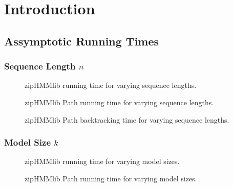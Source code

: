 \documentclass[oneside,a4,danish,english,report]{memoir}
\begin{document}
\tableofcontents

\mainmatter{}

\chapter{Introduction}
\label{cha:introduction}

\section{Assymptotic Running Times}
\label{sec:assymp-runn-times}

\subsection{Sequence Length $n$}
\label{sec:sequence-length-n}

\begin{figure}[H]
  \centering
  
  \caption{zipHMMlib running time for varying sequence lengths.}
  \label{fig:assymptotic_viterbi_n}
\end{figure}

\begin{figure}[H]
  \centering
  
  \caption{zipHMMlib Path running time for varying sequence lengths.}
  \label{fig:assymptotic_viterbi_path_n}
\end{figure}

\begin{figure}[H]
  \centering
  
  \caption{zipHMMlib Path backtracking time for varying sequence lengths.}
  \label{fig:assymptotic_viterbi_backtrack_n}
\end{figure}

\subsection{Model Size $k$}
\label{sec:model-size-k}

\begin{figure}[H]
  \centering
  
  \caption{zipHMMlib running time for varying model sizes.}
  \label{fig:assymptotic_viterbi_k}
\end{figure}

\begin{figure}[H]
  \centering
  
  \caption{zipHMMlib Path running time for varying model sizes.}
  \label{fig:assymptotic_viterbi_path_k}
\end{figure}
\end{document}
